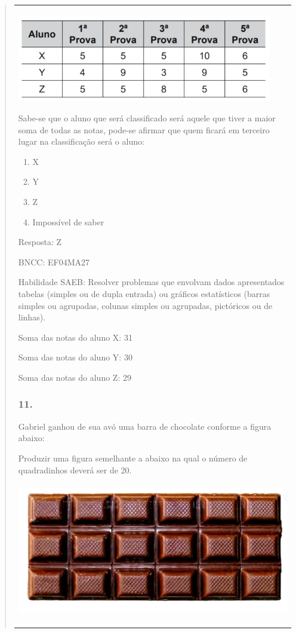 \begin{enumerate}
\begin{escolha}
\begin{enumerate}
\begin{itemize}
\begin{itemize}
\begin{escolha}
\begin{quote}
\begin{escolha}
{\begin{longtable}[]{@{}l@{}}
\begin{itemize}
\includegraphics[width=4.38462in,height=1.50708in]{media/image157.png}

Sabe-se que o aluno que será classificado será aquele que tiver a maior
soma de todas as notas, pode-se afirmar que quem ficará em terceiro
lugar na classificação será o aluno:

\begin{enumerate}
\def\labelenumi{\alph{enumi})}
\item
  X
\item
  Y
\item
  Z
\item
  Impossível de saber
\end{enumerate}

Resposta: Z

BNCC: EF04MA27

Habilidade SAEB: Resolver problemas que envolvam dados apresentados
tabelas (simples ou de dupla entrada) ou gráficos estatísticos (barras
simples ou agrupadas, colunas simples ou agrupadas, pictóricos ou de
linhas).

Soma das notas do aluno X: 31

Soma das notas do aluno Y: 30

Soma das notas do aluno Z: 29

\subsubsection{11.}\label{section-167}

Gabriel ganhou de sua avó uma barra de chocolate conforme a figura
abaixo:

Produzir uma figura semelhante a abaixo na qual o número de quadradinhos
deverá ser de 20.

\includegraphics[width=4.89209in,height=2.26686in]{media/image158.png}


\end{itemize}
\end{longtable}}
\end{escolha}
\end{quote}
\end{escolha}
\end{itemize}
\end{itemize}
\end{enumerate}
\end{escolha}
\end{enumerate}
